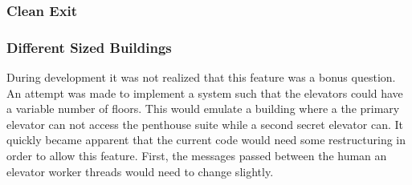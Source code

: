 \documentclass{article}
\begin{document}
\subsubsection{Clean Exit}

\subsubsection{Different Sized Buildings}
During development it was not realized that this feature was a bonus question. 
An attempt was made to implement a system such that the elevators could have a variable number of floors.
This would emulate a building where a the primary elevator can not access the penthouse suite while a second secret elevator can.
It quickly became apparent that the current code would need some restructuring in order to allow this feature.
First, the messages passed between the human an elevator worker threads would need to change slightly.
\end{document}
